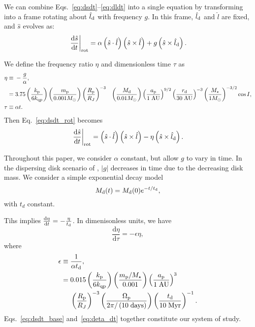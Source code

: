 \documentclass[
        fleqn,
        usenatbib,
        referee,
    ]{mnras}
\newcommand*{\rd}[2]{\frac{\mathrm{d}#1}{\mathrm{d}#2}}
\newcommand*{\at}[1]{\left.#1\right|}
\newcommand*{\abs}[1]{\left|#1\right|}
\newcommand*{\p}[1]{\left(#1\right)}
\begin{document}
We can combine Eqs.~\eqref{eq:dsdt}--\eqref{eq:dldt} into a single equation by
transforming into a frame rotating about $\hat{l}_{\rm d}$ with frequency $g$.
In this frame, $\hat{l}_{\rm d}$ and $\hat{l}$ are fixed, and $\hat{s}$ evolves
as:
\begin{equation}
    \at{\rd{\hat{s}}{t}}_{\rm rot} = \alpha \p{\hat{s} \cdot \hat{l}}
            \p{\hat{s} \times \hat{l}}
        + g\p{\hat{s} \times \hat{l}_{\rm d}}.\label{eq:dsdt_rot}
\end{equation}

We define the frequency ratio $\eta$ and dimensionless time $\tau$ as
\begin{align}
    \eta \equiv{}& -\frac{g}{\alpha}\label{eq:eta},\\
        ={}& 3.75 \p{\frac{k_{\rm p}}{6k_{\rm qp}}}
            \p{\frac{m_{\rm p}}{0.001 M_\odot}}
            \p{\frac{R_{\rm p}}{R_J}}^{-3}
        &\p{\frac{M_{\rm d}}{0.01 M_{\odot}}}
            \p{\frac{a_{\rm p}}{1\;\mathrm{AU}}}^{9/2}
            \p{\frac{r_{\rm d}}{30 \;\mathrm{AU}}}^{-3}
            \p{\frac{M_\star}{1M_{\odot}}}^{-3/2}
            \cos I,\\
    \tau \equiv{}& \alpha t.
\end{align}
Then Eq.~\eqref{eq:dsdt_rot} becomes
\begin{equation}
    \at{\rd{\hat{s}}{t}}_{\rm rot} = \p{\hat{s} \cdot \hat{l}}
            \p{\hat{s} \times \hat{l}}
        - \eta\p{\hat{s} \times \hat{l}_{\rm d}}. \label{eq:dsdt_base}
\end{equation}

Throughout this paper, we consider $\alpha$ constant, but allow $g$ to vary in
time. In the dispersing disk scenario of \citet{millholland_disk}, $\abs{g}$
decreases in time due to the decreasing disk mass. We consider a simple
exponential decay model
\begin{equation}
    M_{\rm d}(t) = M_{\rm d}(0)e^{-t/t_{\rm d}},
\end{equation}
with $t_d$ constant.

Tihs implies $\rd{\eta}{t} = -\frac{\eta}{t_{\rm d}}$. In dimenisonless units,
we have
\begin{equation}
    \rd{\eta}{\tau} = -\epsilon \eta\label{eq:deta_dt},
\end{equation}
where
\begin{align}
    \epsilon \equiv{}& \frac{1}{\alpha t_{\rm d}},\\
        ={}& 0.015 \p{\frac{k_{\rm p}}{6k_{\rm qp}}}
            \p{\frac{m_{\rm p}/M_\star}{0.001}}
            \p{\frac{a_{\rm p}}{1\;\mathrm{AU}}}^3\nonumber\\
        &\p{\frac{R_{\rm p}}{R_J}}^{-3}
            \p{\frac{\Omega_{\rm p}}{2\pi/\p{10\;\mathrm{days}}}}
            \p{\frac{t_{\rm d}}{10\;\mathrm{Myr}}}^{-1}.
\end{align}
Eqs.~\eqref{eq:dsdt_base} and~\eqref{eq:deta_dt} together constitute our system
of study.
\end{document}
